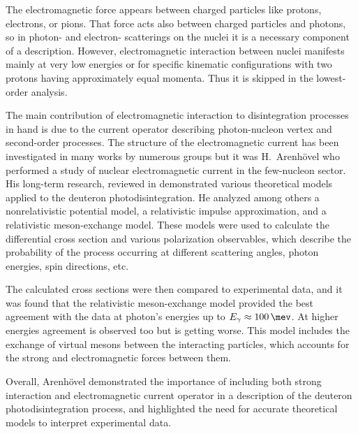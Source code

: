The electromagnetic force appears between charged particles like protons, electrons, or pions.
That force acts also between charged particles and photons, so 
in photon- and electron- scatterings on the nuclei 
it is a necessary component of a description.
However, electromagnetic interaction between nuclei manifests mainly at very 
low energies or for specific kinematic configurations with two
protons having approximately equal momenta.
Thus it is skipped in the lowest-order analysis.

The main contribution of electromagnetic interaction 
to disintegration processes in hand is due to the current operator
describing photon-nucleon vertex and second-order processes.
The structure of the electromagnetic current has been investigated
in many works by numerous groups \cite{Carlson1997} but it was 
H.~Arenh\"{o}vel who performed a study of nuclear electromagnetic
current in the few-nucleon sector.
His long-term research, reviewed in \cite{ArenhovelPhotodisint1991}
demonstrated various theoretical models applied to the deuteron photodisintegration.
He analyzed among others a nonrelativistic potential model,
a relativistic impulse approximation, and a relativistic meson-exchange model.
These models were used to calculate the differential cross section and various
polarization observables, which describe the probability
of the process occurring at different scattering angles, photon energies, spin directions, etc.

The calculated cross sections were then compared to experimental data, and it was
found that the relativistic meson-exchange model provided
the best agreement with the data at photon's energies up to $E_\gamma \approx \SI{100}{\mev}$.
At higher energies agreement is observed too but is getting worse.
This model includes the exchange of virtual mesons
between the interacting particles, which accounts for
the strong and electromagnetic forces between them.

Overall, Arenh\"{o}vel demonstrated the importance of including both strong interaction
and electromagnetic current operator in a description of the deuteron photodisintegration process,
and highlighted the need for accurate theoretical models to interpret experimental data.


